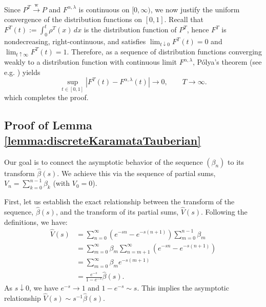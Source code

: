\documentclass[letterpaper]{article}
\numberwithin{equation}{section}
\theoremstyle{definition}
\theoremstyle{remark}
\begin{document}
{
Since $P^T \stackrel{\mathrm{w}}{\longrightarrow} P$ and $F^{\alpha,\lambda}$ is continuous on $[0,\infty)$, we now justify the uniform convergence of the distribution functions on $[0,1]$. 
Recall that $F^T(t):=\int_0^t \rho^T(x)\,dx$ is the distribution function of $P^T$, hence $F^T$ is {nondecreasing, right-continuous, and satisfies $\lim_{t\downarrow 0}F^T(t)=0$ and $\lim_{t\uparrow\infty}F^T(t)=1$}. 
Therefore, {as a sequence of distribution functions converging weakly to a distribution function with continuous limit $F^{\alpha,\lambda}$}, P\'olya's theorem (see e.g. \cite[Chapter~4.3, Exercise~4]{chung2001course}) yields
\[
\sup_{t\in[0,1]}\left|F^T(t)-F^{\alpha,\lambda}(t)\right|\longrightarrow 0,\qquad T\to\infty.
\]
which completes the proof.}


\subsection{Proof of Lemma \ref{lemma:discreteKaramataTauberian}}
\label{subsec:proofofdiscreteKaramataTauberian}
  Our goal is to connect the asymptotic behavior of the sequence $(\beta_n)$ to its transform $\hat{\beta}(s)$. We achieve this via the sequence of partial sums, $V_n = \sum_{k=0}^{n-1} \beta_k$ (with $V_0=0$).

  First, let us establish the exact relationship between the transform of the sequence, $\hat{\beta}(s)$, and the transform of its partial sums, $\hat{V}(s)$. Following the definitions, we have:
  \begin{align*}
    \hat{V}(s) &= \sum_{n=0}^{\infty}(e^{-sn}-e^{-s(n+1)})\sum_{m=0}^{n-1}\beta_{m} \\
    &= \sum_{m=0}^{\infty} \beta_m \sum_{n=m+1}^{\infty}(e^{-sn}-e^{-s(n+1)}) \\
    &= \sum_{m=0}^{\infty}\beta_{m}e^{-s(m+1)} \\
    &= \frac{e^{-s}}{1-e^{-s}}\hat{\beta}(s).
  \end{align*}
  As $s \downarrow 0$, we have $e^{-s} \to 1$ and $1-e^{-s} \sim s$. This implies the asymptotic relationship $\hat{V}(s) \sim s^{-1}\hat{\beta}(s)$.
\end{document}
